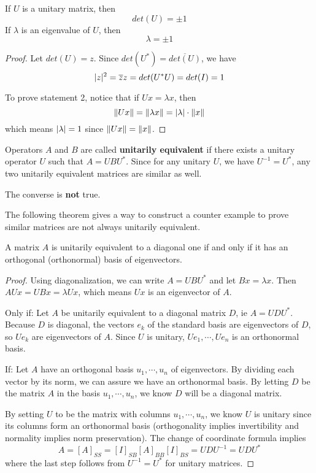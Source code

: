 \begin{theorem}
If $U$ is a unitary matrix, then 
$$ det(U) = \pm 1$$
If $\lambda$ is an eigenvalue of $U$, then 
$$\lambda = \pm 1$$
\end{theorem}

\begin{proof}
Let $det(U) = z$. Since $det(U^{*}) = \overline{det(U)}$, we have 
$$\lvert z\rvert^{2} = \overline{z}z = det(U^{*} U) = det(I) = 1$$

To prove statement 2, notice that if $Ux = \lambda x$, then 
$$\lVert Ux\rVert = \lVert\lambda x\rVert = \lvert\lambda\rvert \cdot \lVert x\rVert$$
which means $\lvert\lambda\rvert = 1$ since $\lVert Ux\rVert = \lVert x\rVert$. 
\end{proof}

\begin{definition}
Operators $A$ and $B$ are called \textbf{unitarily equivalent} if there exists a unitary operator $U$ such that $A = UBU^{*}$. Since for any unitary $U$, we have $U^{-1} = U^{*}$, any two unitarily equivalent matrices are similar as well. 

The converse is \textbf{not} true. 
\end{definition}

The following theorem gives a way to construct a counter example to prove similar matrices are not always unitarily equivalent. 

\begin{theorem}
A matrix $A$ is unitarily equivalent to a diagonal one if and only if it has an orthogonal (orthonormal) basis of eigenvectors. 
\end{theorem}

\begin{proof}
Using diagonalization, we can write $A = UBU^{*}$ and let $Bx = \lambda x$. Then $AUx = UBx = \lambda Ux$, which means $Ux$ is an eigenvector of $A$. 

Only if: Let $A$ be unitarily equivalent to a diagonal matrix $D$, ie $A = UDU^{*}$. Because $D$ is diagonal, the vectors $e_{k}$ of the standard basis are eigenvectors of $D$, so $Ue_{k}$ are eigenvectors of $A$. Since $U$ is unitary, $Ue_{1}, \cdots, Ue_{n}$ is an orthonormal basis. 

If: Let $A$ have an orthogonal basis $u_{1}, \cdots, u_{n}$ of eigenvectors. By dividing each vector by its norm, we can assure we have an orthonormal basis. By letting $D$ be the matrix $A$ in the basis $u_{1}, \cdots, u_{n}$, we know $D$ will be a diagonal matrix. 

By setting $U$ to be the matrix with columns $u_{1}, \cdots, u_{n}$, we know $U$ is unitary since its columns form an orthonormal basis (orthogonality implies invertibility and normality implies norm preservation). The change of coordinate formula implies 
$$A = [A]_{SS} = [I]_{SB} [A]_{BB} [I]_{BS} = UDU^{-1} = UDU^{*}$$
where the last step follows from $U^{-1} = U^{*}$ for unitary matrices. 
\end{proof}

